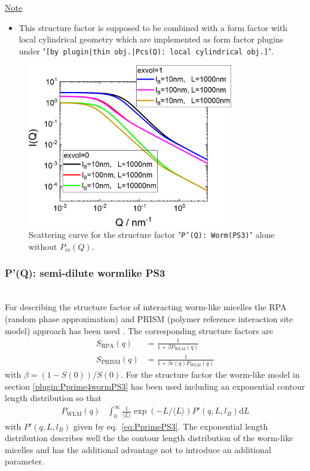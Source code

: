\noindent
\underline{Note}
\begin{itemize}
  \item This structure factor is supposed to be combined with a form factor with local cylindrical geometry which are implemented as form factor plugins
under "\texttt{[by plugin|thin obj.|Pcs(Q): local cylindrical obj.]}".
\end{itemize}

\begin{figure}[htb]
\begin{center}
\includegraphics[width=0.8\textwidth]{../images/form_factor/polymer_semiflexible/PprimeWormPS3.png}
\end{center}
\caption{Scattering curve for the structure factor "\texttt{P'(Q): Worm(PS3)}" alone without $P_\mathrm{cs}(Q)$.}
\label{fig_IQ:PprimeWormPS3}
\end{figure}

\clearpage
\subsubsection{P'(Q): semi-dilute wormlike PS3} ~\\
\label{plugin:Pprime4interactingwormPS3}
For describing the structure factor of interacting worm-like micelles the
RPA (random phase approximation) and PRISM (polymer reference interaction site model) approach has been used \cite{Pedersen2004,Jerke1997,Cannavacciuolo2002,Cannavacciuolo2002a,Pedersen1999,Pedersen2008}. The corresponding structure factors are
\begin{align}
S_\mathrm{RPA}(q) &= \frac{1}{1+\beta P_\mathrm{WLM}(q)} \\
S_\mathrm{PRISM}(q)  &= \frac{1}{1+\beta c(q) P_\mathrm{WLM}(q)}
\end{align}
with $\beta=\left(1-S(0)\right)/S(0)$.
For the structure factor the worm-like model in section \ref{plugin:Pprime4wormPS3} has been used including an exponential contour length distribution so that
\begin{align}\label{eq:Pwlm}
  P_\mathrm{WLM}(q) & \int_0^\infty \frac{1}{\langle L\rangle}\exp\left(-L/\langle L\rangle\right) P'(q,L,l_B) \mathrm{d}L
\end{align}
with $ P'(q,L,l_B)$ given by eq.\ \ref{eq:PprimePS3}. The exponential length distribution describes well the the contour length distribution of the worm-like micelles and has the additional advantage not to introduce an additional parameter.

